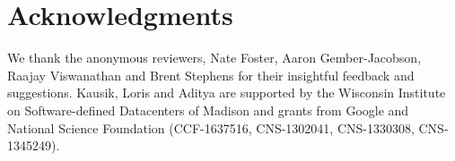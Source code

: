 \section*{Acknowledgments}
We thank the anonymous reviewers,
Nate Foster, Aaron Gember-Jacobson, 
Raajay Viswanathan and Brent Stephens 
for their insightful feedback and suggestions. 
Kausik, Loris and Aditya  
are supported by the Wisconsin Institute
on Software-defined Datacenters of Madison and 
grants from Google and National
Science Foundation (CCF-1637516, CNS-1302041, CNS-1330308, CNS-1345249).